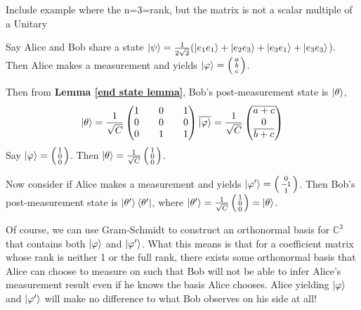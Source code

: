 \begin{example}
\label{example rank full not orth}
Include example where the n=3=rank, but the matrix is not a scalar multiple of a Unitary
\end{example}

\begin{example}
\label{example rank not full}
Say Alice and Bob share a state $\ket{\psi}=\frac{1}{2\sqrt{2}}(\ket{e_1 e_1}+\ket{e_2 e_3}+\ket{e_3 e_1}+\ket{e_3 e_3}$). Then Alice makes a measurement and yields $\ket{\varphi}=\left(\begin{smallmatrix}a\\b\\c\end{smallmatrix}\right)$.

Then from \textbf{Lemma \ref{end state lemma}}, Bob's post-measurement state is $\ket{\theta}$,
\begin{equation}
\ket{\theta}=\frac{1}{\sqrt{C}}\begin{pmatrix}
1 && 0 && 1\\
0 && 0 && 0\\
0 && 1 && 1\\
\end{pmatrix}\overline{\ket{\varphi}}=\frac{1}{\sqrt{C}}\begin{pmatrix}
\overline{a+c}\\
0\\
\overline{b+c}
\end{pmatrix}
\end{equation}
Say $\ket{\varphi}=\left(\begin{smallmatrix}1\\0\\0\end{smallmatrix}\right)$. Then $\ket{\theta}=\frac{1}{\sqrt{C}}\left(\begin{smallmatrix}1\\0\\0\end{smallmatrix}\right)$.

Now consider if Alice makes a measurement and yields $\ket{\varphi'}=\left(\begin{smallmatrix}0\\-1\\1\end{smallmatrix}\right)$. Then Bob's post-measurement state is $\ket{\theta'}\bra{\theta'}$, where $\ket{\theta'}=\frac{1}{\sqrt{C}}\left(\begin{smallmatrix}1\\0\\0\end{smallmatrix}\right)=\ket{\theta}$.

Of course, we can use Gram-Schmidt to construct an orthonormal basis for $\mathbb{C}^3$ that contains both $\ket{\varphi}$ and $\ket{\varphi'}$. What this means is that for a coefficient matrix whose rank is neither 1 or the full rank, there exists some orthonormal basis that Alice can choose to measure on such that Bob will not be able to infer Alice's measurement result even if he knows the basis Alice chooses. Alice yielding $\ket{\varphi}$ and $\ket{\varphi'}$ will make no difference to what Bob observes on his side at all!


\end{example}
